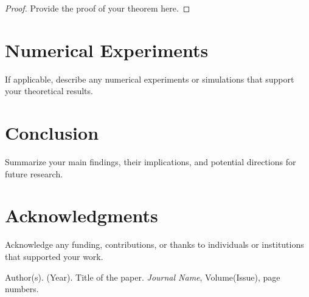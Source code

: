 \documentclass[12pt]{article}
\theoremstyle{definition}
\theoremstyle{remark}
\begin{document}
\begin{proof}
Provide the proof of your theorem here.
\end{proof}

\section{Numerical Experiments}
If applicable, describe any numerical experiments or simulations that support your theoretical results.

\section{Conclusion}
Summarize your main findings, their implications, and potential directions for future research.

\section{Acknowledgments}
Acknowledge any funding, contributions, or thanks to individuals or institutions that supported your work.

\begin{thebibliography}{99}

Author(s). (Year). Title of the paper. \textit{Journal Name}, Volume(Issue), page numbers.

\end{thebibliography}
\end{document}
